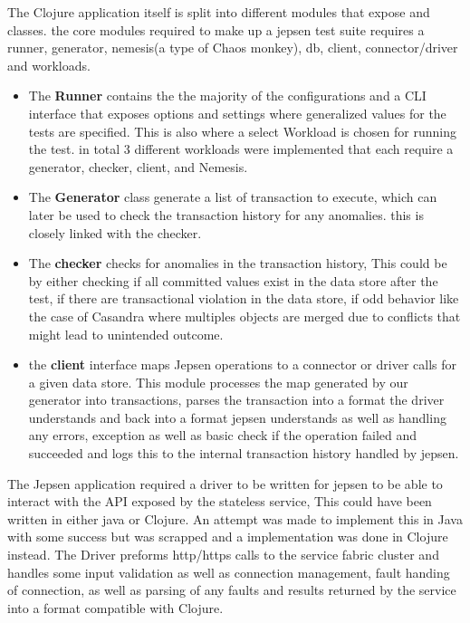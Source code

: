 \documentclass[a4paper,10pt,titlepage]{report}
\begin{document}
        
The Clojure application itself is split into different modules that expose and classes. the core modules required to make up a jepsen test suite requires a runner, generator, nemesis(a type of Chaos monkey)\cite{Choasmonkey}, db, client, connector/driver and workloads.
\begin{itemize}
    \item The \textbf{Runner} contains the the majority of the configurations and a CLI interface that exposes options and settings where generalized values for the tests are specified. This is also where a select Workload is chosen for running the test. in total 3 different workloads were implemented that each require a generator, checker, client, and Nemesis.
        
   \item  The \textbf{Generator} class generate a list of transaction to execute, which can later be used to check the transaction history for any anomalies. this is closely linked with the checker.
        
   \item  The \textbf{checker} checks for anomalies in the transaction history, This could be by either checking if all committed values exist in the data store after the test, if there are transactional violation in the data store, if odd behavior like the case of Casandra where multiples objects are merged due to conflicts that might lead to unintended outcome. 
        
  \item  the \textbf{client} interface maps Jepsen operations to a connector or driver calls for a given data store. This module processes the map generated by our generator into transactions, parses the transaction into a format the driver understands and back into a format jepsen understands as well as handling any errors, exception as well as basic check if the operation failed and succeeded and logs this to the internal transaction history handled by jepsen.
\end{itemize}
        
The Jepsen application required a driver to be written for jepsen to be able to interact with the API exposed by the stateless service, This could have been written in either java or Clojure. An attempt was made to implement this in Java with some success but was scrapped and a implementation was done in Clojure instead. The Driver preforms http/https calls to the service fabric cluster and handles some input validation as well as connection management, fault handing of connection, as well as parsing of any faults and results returned by the service into a format compatible with Clojure.
        
\end{document}
